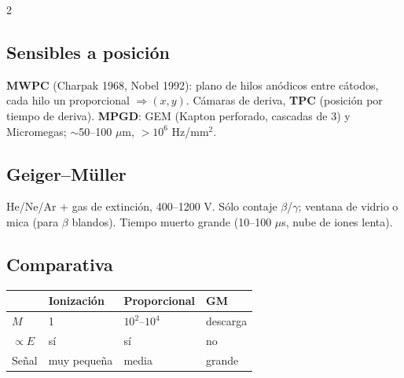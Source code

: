 \documentclass[10pt,a4paper]{article}
\begin{document}
\begin{multicols}{2}
\subsection{Sensibles a posición}
\textbf{MWPC} (Charpak 1968, Nobel 1992): plano de hilos anódicos entre cátodos, cada hilo un proporcional $\Rightarrow(x,y)$.
Cámaras de deriva, \textbf{TPC} (posición por tiempo de deriva). \textbf{MPGD}: GEM (Kapton perforado, cascadas de 3) y Micromegas; $\sim$50--100 $\mu$m, $>10^6$ Hz/mm$^2$.
\subsection{Geiger--Müller}
He/Ne/Ar + gas de extinción, 400--1200 V. Sólo contaje $\beta$/$\gamma$; ventana de vidrio o mica (para $\beta$ blandos). Tiempo muerto grande (10--100 $\mu$s, nube de iones lenta).
\subsection{Comparativa}
\begin{tabular}{@{}llll@{}}
\toprule
& Ionización & Proporcional & GM\\\midrule
$M$ & 1 & $10^2$--$10^4$ & descarga\\
$\propto E$ & sí & sí & no\\
Señal & muy pequeña & media & grande\\\bottomrule
\end{tabular}
\end{multicols}
\newpage

\end{document}
